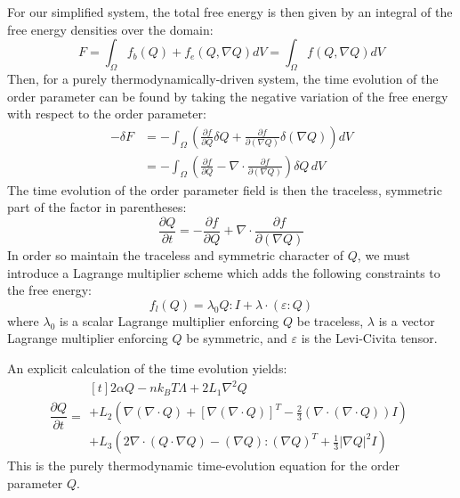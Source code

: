\documentclass[reqno]{article}
\begin{document}
  For our simplified system, the total free energy is then given by an integral
  of the free energy densities over the domain:
  \begin{equation}
    F
    = \int_\Omega f_b(Q) + f_e(Q, \nabla Q) dV
    = \int_\Omega f(Q, \nabla Q) dV
  \end{equation}
  Then, for a purely thermodynamically-driven system, the time evolution
  of the order parameter can be found
  by taking the negative variation of the free energy with respect to the order
  parameter:
  \begin{equation}
    \begin{split}
    -\delta F
    &= -\int_\Omega \left( \frac{\partial f}{\partial Q} \delta Q
      + \frac{\partial f}{\partial (\nabla Q)} \delta (\nabla Q) \right) dV \\
    &= -\int_\Omega \left(
      \frac{\partial f}{\partial Q}
      - \nabla \cdot \frac{\partial f}{\partial (\nabla Q)}
    \right) \delta Q \, dV
    \end{split}
  \end{equation}
  The time evolution of the order parameter field is then the traceless,
  symmetric part of the factor in parentheses:
  \begin{equation}
    \frac{\partial Q}{\partial t}
    =
    -\frac{\partial f}{\partial Q}
    + \nabla \cdot \frac{\partial f}{\partial (\nabla Q)}
  \end{equation}
  In order so maintain the traceless and symmetric character of $Q$, we must
  introduce a Lagrange multiplier scheme which adds the following constraints to
  the free energy:
  \begin{equation}
    f_l (Q) = \lambda_0 Q : I + \lambda \cdot \left( \varepsilon : Q \right)
  \end{equation}
  where $\lambda_0$ is a scalar Lagrange multiplier enforcing $Q$ be traceless,
  $\lambda$ is a vector Lagrange multiplier enforcing $Q$ be symmetric, and
  $\varepsilon$ is the Levi-Civita tensor.
  
  An explicit calculation of the time evolution yields:
  \begin{equation} \label{eq:Q-time-evolution}
    \frac{\partial Q}{\partial t}
    =
    \begin{multlined}[t]
      2 \alpha Q - n k_B T \Lambda + 2 L_1 \nabla^2 Q \\
      + L_2 \left(
        \nabla \left( \nabla \cdot Q \right)
        + \left[ \nabla \left( \nabla \cdot Q \right) \right]^T
        - \tfrac23 \left( \nabla \cdot \left( \nabla \cdot Q \right) \right) I
      \right) \\
      + L_3 \left(
        2 \nabla \cdot \left( Q \cdot \nabla Q \right)
        - \left( \nabla Q \right) : \left( \nabla Q \right)^T
        + \tfrac13 \left| \nabla Q \right|^2 I
      \right)
    \end{multlined}
  \end{equation}
  This is the purely thermodynamic time-evolution equation for the order
  parameter $Q$.
  
\end{document}
